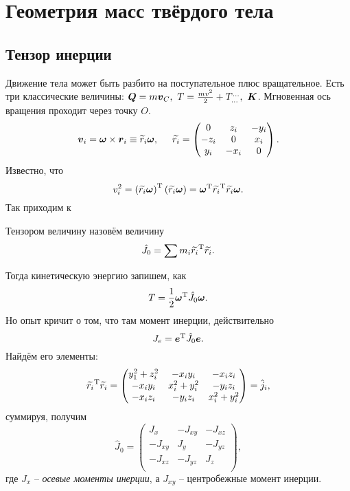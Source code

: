 \section{Геометрия масс твёрдого тела}

\subsection{Тензор инерции}

Движение тела может быть разбито на поступательное плюс вращательное. 
Есть три классические величины: $\mbox{\boldmath $Q$} = m \mbox{\boldmath $v$}_C, \ T=\frac{mv^2}{2} + T_{...}^{...}, \ \mbox{\boldmath $K$}$. Мгновенная ось вращения проходит через точку $O$. 
$$
    \mbox{\boldmath $v$}_i = \mbox{\boldmath $\omega$} \times \mbox{\boldmath $r$}_i \equiv \widetilde r_i \mbox{\boldmath $\omega$},
    \hspace{0.5cm} \widetilde{r_i} = \begin{pmatrix}
        0 &z_i &- y_i \\
        -z_i & 0 & x_i \\
        y_i & -x_i & 0\\
    \end{pmatrix}.
$$
Известно, что
$$
    v_i^2 = \left(
        \widetilde{r_i} \mbox{\boldmath $\omega$}
    \right)^{\text{T}} \left(
        \widetilde{r_i} \mbox{\boldmath $\omega$}
    \right) = \mbox{\boldmath $\omega$}^{\text{T}} \widetilde{r_i}^{\text{T}} \widetilde{r_i} \mbox{\boldmath $\omega$}.
$$
Так приходим к
\begin{to_def} 
Тензором величину назовём величину 
\begin{equation}
    \hat J_0 = \sum m_i \widetilde{r_i}^{\text{T}} \widetilde{r_i}.
\end{equation}
\end{to_def}
Тогда кинетическую энергию запишем, как
\begin{equation}
    T = \frac{1}{2} \mbox{\boldmath $\omega$}^{\text{T}} 
        \hat J_0 \mbox{\boldmath $\omega$}.
\end{equation}
Но опыт кричит о том, что там момент инерции, действительно
\begin{equation}
    J_e = \mbox{\boldmath $e$}^{\text{T}} \hat J_0 \mbox{\boldmath $e$}.
\end{equation}
Найдём его элементы:
\begin{equation}
    \widetilde{r_i}^{\text{T}} \widetilde{r_i} = \begin{pmatrix}
        y_1^2 + z_i^2 & -x_i y_i & - x_i z_i \\
        -x_i y_i & x_i^2 + y_i^2 & - y_i z_i \\
        -x_i z_i & -y_i z_i & x_i^2 + y_i^2 \\
    \end{pmatrix} = \hat j_i,
\end{equation}
суммируя, получим
\begin{equation}
    \hat J_0 = \begin{pmatrix}
        J_x & - J_{xy} & -J_{xz} \\
        -J_{xy} & J_y & -J_{yz} \\
        -J_{xz} & -J_{yz} & J_z \\
    \end{pmatrix},
\end{equation}
где $J_x$ -- \textit{осевые моменты инерции}, а $J_{xy}$ -- центробежные момент инерции. 

